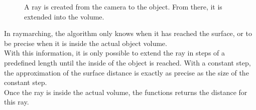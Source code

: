 \begin{figure}[H]
    \centering
    \caption{A ray is created from the camera to the object. From there, it is extended into the volume.}
\end{figure}

\pagebreak
\noindent
In \gls{raymarching}, the algorithm only knows when it has reached the surface, or to be precise when it is inside the actual object volume.
\\
With this information, it is only possible to extend the ray in steps of a predefined length until the inside of the object is reached.
With a constant step, the approximation of the surface distance is exactly as precise as the size of the constant step.
\\
Once the ray is inside the actual volume, the functions returns the distance for this ray.

